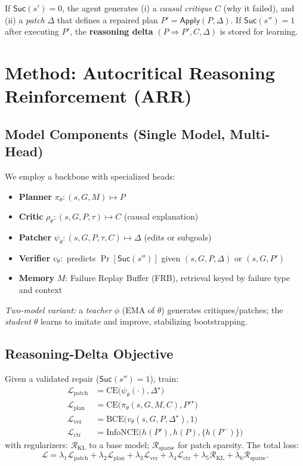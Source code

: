 \documentclass[11pt]{article}
\newcommand{\Suc}{\mathsf{Suc}}
\newcommand{\CE}{\mathrm{CE}}
\newcommand{\BCE}{\mathrm{BCE}}
\newcommand{\InfoNCE}{\mathrm{InfoNCE}}
\begin{document}
If $\Suc(s')=0$, the agent generates (i) a \emph{causal critique} $C$ (why it failed), and (ii) a \emph{patch} $\Delta$ that defines a repaired plan $P' = \mathsf{Apply}(P,\Delta)$. If $\Suc(s'')=1$ after executing $P'$, the \textbf{reasoning delta} $(P \Rightarrow P', C, \Delta)$ is stored for learning.

\section{Method: Autocritical Reasoning Reinforcement (ARR)}
\subsection{Model Components (Single Model, Multi-Head)}
We employ a backbone with specialized heads:
\begin{itemize}[leftmargin=1.2em]
    \item \textbf{Planner} $\pi_\theta: (s,G,M) \mapsto P$
    \item \textbf{Critic} $\rho_\theta: (s,G,P,\tau) \mapsto C$ \; (causal explanation)
    \item \textbf{Patcher} $\psi_\theta: (s,G,P,\tau,C) \mapsto \Delta$ \; (edits or subgoals)
    \item \textbf{Verifier} $v_\theta:$ predicts $\Pr[\Suc(s'')]$ given $(s,G,P,\Delta)$ or $(s,G,P')$
    \item \textbf{Memory} $M$: Failure Replay Buffer (FRB), retrieval keyed by failure type and context
\end{itemize}
\textit{Two-model variant:} a \emph{teacher} $\phi$ (EMA of $\theta$) generates critiques/patches; the \emph{student} $\theta$ learns to imitate and improve, stabilizing bootstrapping.

\subsection{Reasoning-Delta Objective}
Given a validated repair ($\Suc(s'')=1$), train:
\begin{align*}
\mathcal{L}_{\text{patch}} &= \CE\!\big(\psi_\theta(\cdot), \Delta^\star\big) \\
\mathcal{L}_{\text{plan}}  &= \CE\!\big(\pi_\theta(s,G,M,C), P'^{\star}\big) \\
\mathcal{L}_{\text{ver}}   &= \BCE\!\big(v_\theta(s,G,P,\Delta^\star), 1\big) \\
\mathcal{L}_{\text{ctr}}   &= \InfoNCE\!\big(h(P'), h(P), \{h(P^{-})\}\big)
\end{align*}
with regularizers: $\mathcal{R}_{\text{KL}}$ to a base model; $\mathcal{R}_{\text{sparse}}$ for patch sparsity. The total loss:
\[
\mathcal{L} = \lambda_1 \mathcal{L}_{\text{patch}}
+ \lambda_2 \mathcal{L}_{\text{plan}}
+ \lambda_3 \mathcal{L}_{\text{ver}}
+ \lambda_4 \mathcal{L}_{\text{ctr}}
+ \lambda_5 \mathcal{R}_{\text{KL}}
+ \lambda_6 \mathcal{R}_{\text{sparse}}.
\]
\end{document}
